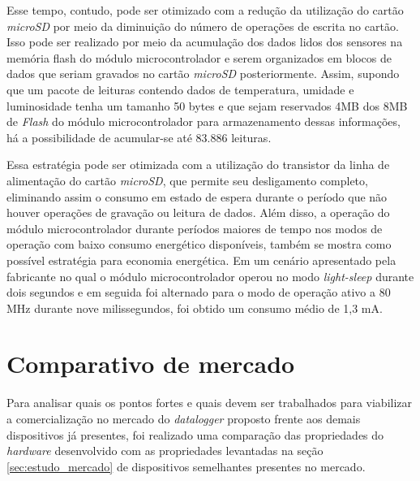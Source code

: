 Esse tempo, contudo, pode ser otimizado com a redução da utilização do cartão \textit{microSD} por meio da diminuição do número de operações de escrita no cartão. Isso pode ser realizado por meio da acumulação dos dados lidos dos sensores na memória flash do módulo microcontrolador e serem organizados em blocos de dados que seriam gravados no cartão \textit{microSD} posteriormente. Assim, supondo que um pacote de leituras contendo dados de temperatura, umidade e luminosidade tenha um tamanho 50 bytes e que sejam reservados 4MB dos 8MB de \textit{Flash} do módulo microcontrolador para armazenamento dessas informações, há a possibilidade de acumular-se até 83.886 leituras. 

Essa estratégia pode ser otimizada com a utilização do transistor da linha de alimentação do cartão \textit{microSD}, que permite seu desligamento completo, eliminando assim o consumo em estado de espera durante o período que não houver operações de gravação ou leitura de dados. Além disso, a operação do módulo microcontrolador durante períodos maiores de tempo nos modos de operação com baixo consumo energético disponíveis, também se mostra como possível estratégia para economia energética. Em um cenário apresentado pela fabricante  no qual o módulo microcontrolador operou no modo \textit{light-sleep} durante dois segundos e em seguida foi alternado para o modo de operação ativo a 80 MHz durante nove milissegundos, foi obtido um consumo médio de 1,3 mA.


\section{Comparativo de mercado}

Para analisar quais os pontos fortes e quais devem ser trabalhados para viabilizar a comercialização no mercado do \textit{datalogger} proposto frente aos demais dispositivos já presentes, foi realizado uma comparação das propriedades do \textit{hardware} desenvolvido com as propriedades levantadas na seção \ref{sec:estudo_mercado} de dispositivos semelhantes presentes no mercado.



